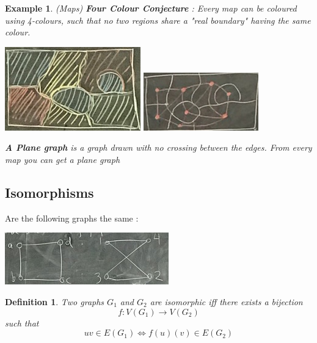 \documentclass{article}
\newtheorem{ex}[theorem]{Example}
\newtheorem{definition}[theorem]{Definition}
\begin{document}
\begin{ex} (Maps)
\textbf{Four Colour Conjecture} : Every map can be coloured using 4-colours, such that no two regions share a "real boundary" having the same colour.

\begin{center}
\includegraphics[scale=0.5]{4}
\includegraphics[scale=0.7]{5}
\end{center}
\newpage
\textbf{A Plane graph} is a graph drawn with no crossing between the edges. 
From every map you can get a plane graph 
\end{ex}

\subsection{Isomorphisms}
Are the following graphs the same : \\
\begin{center}
\includegraphics[scale=0.8]{6}
\end{center}
\begin{definition}
Two graphs \(G_1\) and \(G_2\) are isomorphic iff there exists a bijection 
$$ f : V(G_1) \longrightarrow V(G_2)$$
such that 
$$ uv \in E(G_1) \iff f(u)(v) \in E(G_2) $$
\end{definition}
\end{document}
